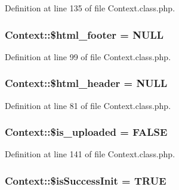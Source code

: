Definition at line 135 of file Context.\+class.\+php.

\hypertarget{classContext_ad55e79b648659c59512e02a6c0d349ff}{}
\subsubsection[{\$html\+\_\+footer}]{\setlength{\rightskip}{0pt plus 5cm}Context\+::\$html\+\_\+footer = N\+U\+L\+L}\label{classContext_ad55e79b648659c59512e02a6c0d349ff}


Definition at line 99 of file Context.\+class.\+php.

\hypertarget{classContext_ab0146079ffcc658bbe5bbf4ba7b8e934}{}
\subsubsection[{\$html\+\_\+header}]{\setlength{\rightskip}{0pt plus 5cm}Context\+::\$html\+\_\+header = N\+U\+L\+L}\label{classContext_ab0146079ffcc658bbe5bbf4ba7b8e934}


Definition at line 81 of file Context.\+class.\+php.

\hypertarget{classContext_a4f8c544baae73ab83d08ec55e0c7c00d}{}
\subsubsection[{\$is\+\_\+uploaded}]{\setlength{\rightskip}{0pt plus 5cm}Context\+::\$is\+\_\+uploaded = F\+A\+L\+S\+E}\label{classContext_a4f8c544baae73ab83d08ec55e0c7c00d}


Definition at line 141 of file Context.\+class.\+php.

\hypertarget{classContext_a342fb7b74268197dea5cadbe62aaea7a}{}
\subsubsection[{\$is\+Success\+Init}]{\setlength{\rightskip}{0pt plus 5cm}Context\+::\$is\+Success\+Init = T\+R\+U\+E}\label{classContext_a342fb7b74268197dea5cadbe62aaea7a}


